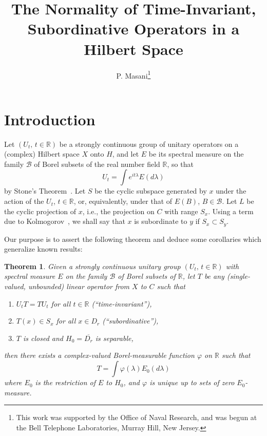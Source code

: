 \documentclass[12pt]{article}
\title{The Normality of Time-Invariant, Subordinative Operators in a Hilbert Space}
\author{P. Masani\thanks{This work was supported by the Office of Naval Research, and was begun at the Bell Telephone Laboratories, Murray Hill, New Jersey.}}
\date{}
\newtheorem{theorem}{Theorem}[section]
\theoremstyle{definition}
\begin{document}
\maketitle

\section{Introduction}

Let $(U_t,\, t\in\mathbb{R})$ be a strongly continuous group of unitary operators on a (complex) Hilbert space $X$ onto $H$, and let $E$ be its spectral measure on the family $\mathcal{B}$ of Borel subsets of the real number field $\mathbb{R}$, so that
\begin{equation}
U_t = \int e^{it\lambda} E(d\lambda)
\label{eq:stone}
\end{equation}
by Stone's Theorem~\cite{stone1951}. Let $S$ be the cyclic subspace generated by $x$ under the action of the $U_t$, $t\in\mathbb{R}$, or, equivalently, under that of $E(B)$, $B\in\mathcal{B}$. Let $L$ be the cyclic projection of $x$, i.e., the projection on $C$ with range $S_x$. Using a term due to Kolmogorov~\cite{kolmogorov1941}, we shall say that $x$ is subordinate to $y$ if $S_x \subset S_y$.

Our purpose is to assert the following theorem and deduce some corollaries which generalize known results:

\begin{theorem}\label{thm:main}
Given a strongly continuous unitary group $(U_t,\, t\in\mathbb{R})$ with spectral measure $E$ on the family $\mathcal{B}$ of Borel subsets of $\mathbb{R}$, let $T$ be any (single-valued, unbounded) linear operator from $X$ to $C$ such that
\begin{enumerate}[label=(\roman*)]
    \item \label{itm:timeinv} $U_t T = T U_t$ for all $t\in\mathbb{R}$ (``time-invariant''),
    \item \label{itm:subord} $T(x) \in S_x$ for all $x\in D_r$ (``subordinative''),
    \item \label{itm:closedsep} $T$ is closed and $H_0 = \overline{D_r}$ is separable,
\end{enumerate}
then there exists a complex-valued Borel-measurable function $\varphi$ on $\mathbb{R}$ such that
\begin{equation}
T = \int \varphi(\lambda) E_0(d\lambda)
\label{eq:spectralint}
\end{equation}
where $E_0$ is the restriction of $E$ to $H_0$, and $\varphi$ is unique up to sets of zero $E_0$-measure.
\end{theorem}
\end{document}
